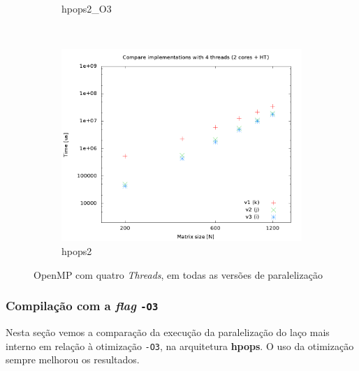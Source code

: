 \documentclass[a4paper, 12pt]{article}
\begin{document}
\begin{figure}[H]
\begin{subfigure}[H]{0.5\textwidth}
        \caption{hpops2\_O3}
        \label{fig:hpops2_O3_cmp_4t}
    \end{subfigure}
    ~ %
    \begin{subfigure}[H]{0.5\textwidth}
        \includegraphics[width=\textwidth]{hpops2_cmp_versions-4t}
        \caption{hpops2}
        \label{fig:hpops2_cmp_4t}
    \end{subfigure}%
    \caption{OpenMP com quatro \textit{Threads}, em todas as versões de paralelização}\label{fig:animals}
\end{figure}

\subsubsection{Compilação com a \textit{flag} \texttt{-O3}}

Nesta seção vemos a comparação da execução da paralelização do laço
mais interno em relação à otimização \texttt{-O3}, na arquitetura
\textbf{hpops}. O uso da otimização sempre melhorou os resultados.
\end{document}
